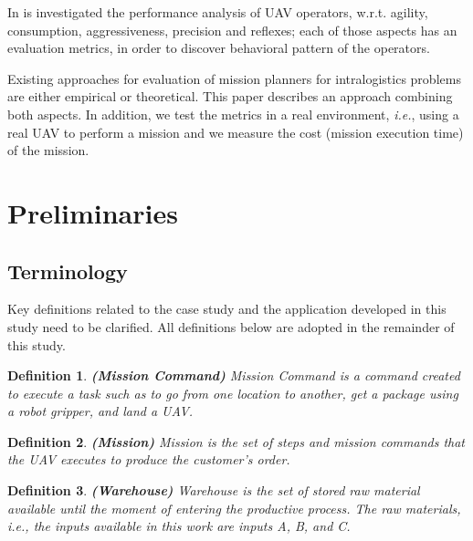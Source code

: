 \documentclass[conference]{IEEEtran}
\newtheorem{myDefinition}{Definition}
\begin{document}
In \cite{rodriguezstudy} is investigated the performance analysis of UAV operators, w.r.t. agility, consumption, aggressiveness, precision and reflexes; each of those aspects has an evaluation metrics, in order to discover behavioral pattern of the operators.

Existing approaches for evaluation of mission planners for intralogistics problems are either empirical or theoretical. This paper describes an approach combining both aspects. In addition, we test the metrics in a real environment, \textit{i.e.}, using a real UAV to perform a mission and we measure the cost (mission execution time) of the mission.

\section{Preliminaries}
\label{sec:background}

\subsection{Terminology}
\label{sec:terms}

Key definitions related to the case study and the application developed in this study need to be clarified. All definitions below are adopted in the remainder of this study.

\begin{myDefinition} 
\textbf{(Mission Command)} 
Mission Command is a command created to execute a task such as to go from one location to another, get a package using a robot gripper, and land a UAV.
\label{def:missioncommand}
\end{myDefinition}

\begin{myDefinition}
\textbf{(Mission)} 
Mission is the set of steps and mission commands that the UAV executes to produce the customer's order.
\label{def:mission}
\end{myDefinition}

\begin{myDefinition}
\textbf{(Warehouse)}
Warehouse is the set of stored raw material available until the moment of entering the productive process. The raw materials, \textit{i.e.}, the inputs available in this work are inputs A, B, and C.
\label{def:almoxarifado}
\end{myDefinition}
\end{document}
